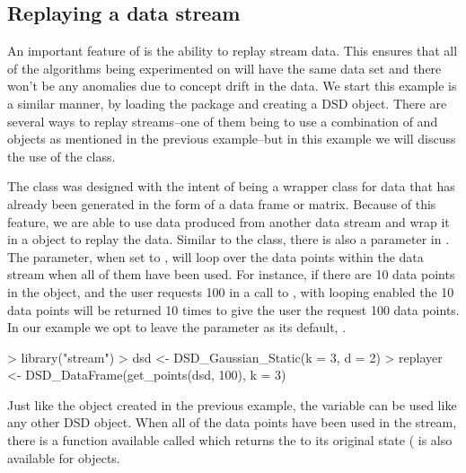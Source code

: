 \documentclass[nojss]{jss}
\begin{document}
\subsection{Replaying a data stream}
\label{examples:replay}

An important feature of  is the ability to replay stream data. This ensures that all of the algorithms being experimented on will have the same data set and there won't be any anomalies due to concept drift in the data. We start this example is a similar manner, by loading the package and creating a DSD object. There are several ways to replay streams--one of them being to use a combination of  and  objects as mentioned in the previous example--but in this example we will discuss the use of the  class.

The  class was designed with the intent of being a wrapper class for data that has already been generated in the form of a data frame or matrix. Because of this feature, we are able to use data produced from another data stream and wrap it in a  object to replay the data. Similar to the  class, there is also a  parameter in . The  parameter, when set to , will loop over the data points within the data stream when all of them have been used. For instance, if there are 10 data points in the object, and the user requests 100 in a call to , with looping enabled the 10 data points will be returned 10 times to give the user the request 100 data points. In our example we opt to leave the  parameter as its default, .

\begin{Schunk}
\begin{Sinput}
> library("stream")
> dsd <- DSD_Gaussian_Static(k = 3, d = 2)
> replayer <- DSD_DataFrame(get_points(dsd, 100), k = 3)
\end{Sinput}
\end{Schunk}

Just like the  object created in the previous example, the  variable can be used like any other DSD object. When all of the data points have been used in the stream, there is a function available called  which returns the  to its original state ( is also available for  objects. 
\end{document}
